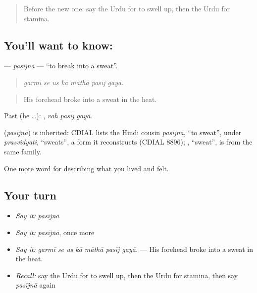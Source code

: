 \begin{quote}
Before the new one: say the Urdu for to swell up, then the Urdu for stamina.
\end{quote}

\subsection*{You'll want to know: }
\textbf{} — \emph{pasījnā} — \textquotedblleft{}to break into a sweat\textquotedblright{}.

\begin{quote}
      
\end{quote}

\begin{quote}
\emph{garmī se us kā māthā pasīj gayā.}
\end{quote}

\begin{quote}
His forehead broke into a sweat in the heat.
\end{quote}

Past (he …):   , \emph{voh pasīj gayā}.

\begin{cousinweb}
\textbf{} (\emph{pasījnā}) is inherited: CDIAL lists the Hindi cousin \emph{pasījnā}, \textquotedblleft{}to sweat\textquotedblright{}, under \emph{prasvidyati}, \textquotedblleft{}sweats\textquotedblright{}, a form it reconstructs (CDIAL 8896); \textbf{}, \textquotedblleft{}sweat\textquotedblright{}, is from the same family.
\end{cousinweb}

\begin{grammarlens}[title={What you've built}]
One more word for describing what you lived and felt.
\end{grammarlens}

\subsection*{Your turn}
\begin{itemize}
\raggedright
  \item \emph{Say it:} \emph{pasījnā}
  \item \emph{Say it:} \emph{pasījnā}, once more
  \item \emph{Say it:} \emph{garmī se us kā māthā pasīj gayā.} — His forehead broke into a sweat in the heat.
  \item \emph{Recall:} say the Urdu for to swell up, then the Urdu for stamina, then say \emph{pasījnā} again
\end{itemize}

